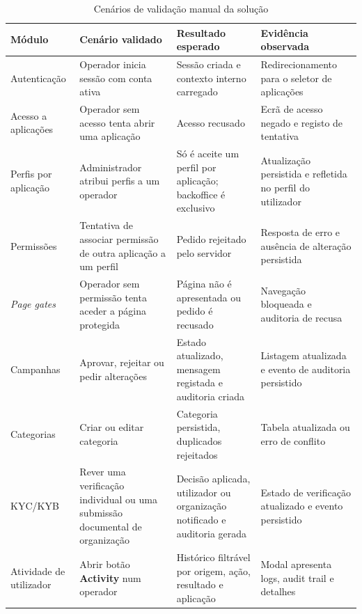 \begin{table}[H]
\caption{Cenários de validação manual da solução}
\label{tab:validacao_manual}
\begin{center}
\begingroup
\scriptsize
\setlength{\tabcolsep}{4pt}
\begin{tabular}{|>{\raggedright\arraybackslash}p{2.4cm}|>{\raggedright\arraybackslash}p{3.5cm}|>{\raggedright\arraybackslash}p{3.5cm}|>{\raggedright\arraybackslash}p{2.8cm}|}
\hline
\textbf{Módulo} & \textbf{Cenário validado} & \textbf{Resultado esperado} & \textbf{Evidência observada} \\ \hline
Autenticação & Operador inicia sessão com conta ativa & Sessão criada e contexto interno carregado & Redirecionamento para o seletor de aplicações \\ \hline
Acesso a aplicações & Operador sem acesso tenta abrir uma aplicação & Acesso recusado & Ecrã de acesso negado e registo de tentativa \\ \hline
Perfis por aplicação & Administrador atribui perfis a um operador & Só é aceite um perfil por aplicação; backoffice é exclusivo & Atualização persistida e refletida no perfil do utilizador \\ \hline
Permissões & Tentativa de associar permissão de outra aplicação a um perfil & Pedido rejeitado pelo servidor & Resposta de erro e ausência de alteração persistida \\ \hline
\textit{Page gates} & Operador sem permissão tenta aceder a página protegida & Página não é apresentada ou pedido é recusado & Navegação bloqueada e auditoria de recusa \\ \hline
Campanhas & Aprovar, rejeitar ou pedir alterações & Estado atualizado, mensagem registada e auditoria criada & Listagem atualizada e evento de auditoria persistido \\ \hline
Categorias & Criar ou editar categoria & Categoria persistida, duplicados rejeitados & Tabela atualizada ou erro de conflito \\ \hline
KYC/KYB & Rever uma verificação individual ou uma submissão documental de organização & Decisão aplicada, utilizador ou organização notificado e auditoria gerada & Estado de verificação atualizado e evento persistido \\ \hline
Atividade de utilizador & Abrir botão \textbf{Activity} num operador & Histórico filtrável por origem, ação, resultado e aplicação & Modal apresenta logs, audit trail e detalhes \\ \hline
\end{tabular}
\endgroup
\end{center}
\end{table}

